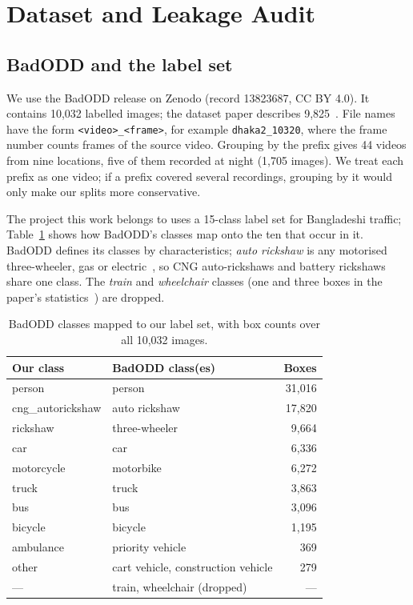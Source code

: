 \documentclass[conference]{IEEEtran}
\newcommand{\vid}[1]{\texttt{#1}}            %
\begin{document}
\section{Dataset and Leakage Audit}
\label{sec:audit}

\subsection{BadODD and the label set}
We use the BadODD release on Zenodo (record 13823687, CC BY 4.0). It contains 10,032 labelled images; the
dataset paper describes 9,825~\cite{badodd}. File names have the form \vid{<video>\_<frame>}, for example
\vid{dhaka2\_10320}, where the frame number counts frames of the source video. Grouping by the prefix gives
44 videos from nine locations, five of them recorded at night (1,705 images). We treat each prefix as one
video; if a prefix covered several recordings, grouping by it would only make our splits more conservative.

The project this work belongs to uses a 15-class label set for Bangladeshi traffic; Table~\ref{tab:classes}
shows how BadODD's classes map onto the ten that occur in it. BadODD defines its classes by
characteristics; \emph{auto rickshaw} is any motorised three-wheeler, gas or electric~\cite{badodd}, so CNG
auto-rickshaws and battery rickshaws share one class. The \emph{train} and
\emph{wheelchair} classes (one and three boxes in the paper's statistics~\cite{badodd}) are dropped.

\begin{table}[t]
\centering
\caption{BadODD classes mapped to our label set, with box counts over all 10,032 images.}
\label{tab:classes}
\begin{tabular}{@{}llr@{}}
\toprule
Our class & BadODD class(es) & Boxes \\
\midrule
person & person & 31,016 \\
cng\_autorickshaw & auto rickshaw & 17,820 \\
rickshaw & three-wheeler & 9,664 \\
car & car & 6,336 \\
motorcycle & motorbike & 6,272 \\
truck & truck & 3,863 \\
bus & bus & 3,096 \\
bicycle & bicycle & 1,195 \\
ambulance & priority vehicle & 369 \\
other & cart vehicle, construction vehicle & 279 \\
\midrule
--- & train, wheelchair (dropped) & --- \\
\bottomrule
\end{tabular}
\end{table}
\end{document}
